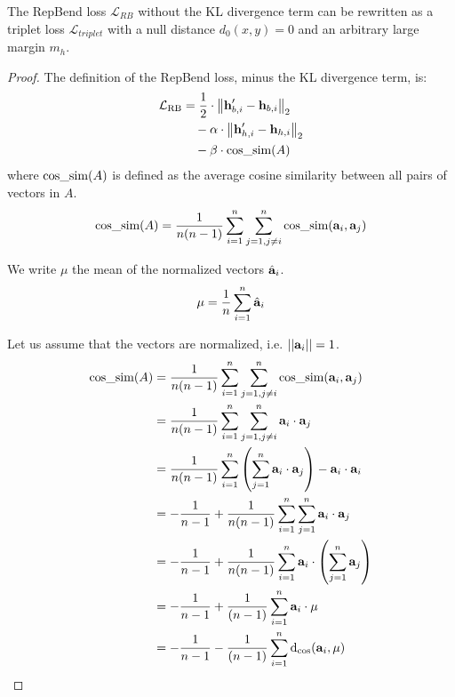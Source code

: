 \documentclass[11pt]{article}
\begin{document}
\begin{theorem}

The RepBend loss $\mathcal{L}_{RB}$ without the KL divergence term can be rewritten as a triplet loss $\mathcal{L}_{triplet}$
with a null distance $d_0(x, y) = 0$ and an arbitrary large margin $m_h$.

\end{theorem}
\begin{proof}
The definition of the RepBend loss, minus the KL divergence term, is:
\begin{align}
  \mathcal{L}_{\text{RB}} &= \frac{1}{2} \cdot \left\| \textbf{h}^\prime_{b,i} - \textbf{h}_{b,i} \right\|_2  \\
                          &\quad- \alpha \cdot \left\| \textbf{h}^\prime_{h,i} - \textbf{h}_{h,i} \right\|_2  \\
														&\quad- \beta \cdot \text{cos\_sim}(A) 
\end{align}
where $\text{cos\_sim}(A)$ is defined as the average cosine similarity between all pairs of vectors in $A$.
\begin{align}
	\text{cos\_sim}(A) = \frac{1}{n(n-1)} \sum_{i=1}^{n} \sum_{j=1, j \neq i}^{n} \text{cos\_sim}(\mathbf{a}_i, \mathbf{a}_j)
\end{align}

We write $\mu$ the mean of the normalized vectors $\hat{\mathbf{a}}_i$.
\begin{align}
    \mu = \frac{1}{n} \sum_{i=1}^{n} \hat{\mathbf{a}}_i
\end{align}

Let us assume that the vectors are normalized, i.e. $||\mathbf{a}_i|| = 1$.
\begin{align}
  \text{cos\_sim}(A) &= \frac{1}{n(n-1)} \sum_{i=1}^{n} \sum_{j=1, j \neq i}^{n} \text{cos\_sim}(\mathbf{a}_i, \mathbf{a}_j) \\
             &= \frac{1}{n(n-1)} \sum_{i=1}^{n} \sum_{j=1, j \neq i}^{n} \mathbf{a}_i \cdot \mathbf{a}_j \\
             &= \frac{1}{n(n-1)} \sum_{i=1}^{n} \left(\sum_{j=1}^{n} \mathbf{a}_i \cdot \mathbf{a}_j\right) - \mathbf{a}_i \cdot \mathbf{a}_i \\
             &= -\frac{1}{n-1} +  \frac{1}{n(n-1)} \sum_{i=1}^{n} \sum_{j=1}^{n} \mathbf{a}_i \cdot \mathbf{a}_j \\
             &= -\frac{1}{n-1} +  \frac{1}{n(n-1)} \sum_{i=1}^{n} \mathbf{a}_i \cdot \left(\sum_{j=1}^{n} \mathbf{a}_j\right) \\
             &= -\frac{1}{n-1} +  \frac{1}{(n-1)} \sum_{i=1}^{n} \mathbf{a}_i \cdot \mu \\
             &= -\frac{1}{n-1} - \frac{1}{(n-1)} \sum_{i=1}^{n} \text{d}_{\cos}(\mathbf{a}_i, \mu)
\end{align}


\end{proof}
\end{document}

